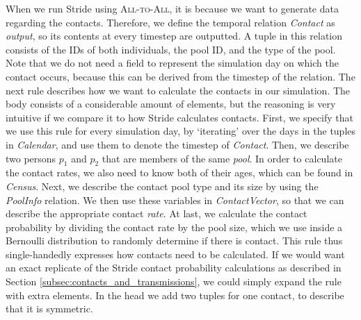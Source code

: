 \noindent When we run Stride using \textsc{All-to-All}, it is because we want to generate data regarding the contacts. Therefore, we define the temporal relation \textit{Contact} as \textit{output}, so its contents at every timestep are outputted. A tuple in this relation consists of the IDs of both individuals, the pool ID, and the type of the pool. Note that we do not need a field to represent the simulation day on which the contact occurs, because this can be derived from the timestep of the relation. The next rule describes how we want to calculate the contacts in our simulation. The body consists of a considerable amount of elements, but the reasoning is very intuitive if we compare it to how Stride calculates contacts. First, we specify that we use this rule for every simulation day, by `iterating' over the days in the tuples in \textit{Calendar}, and use them to denote the timestep of \textit{Contact}. Then, we describe two persons $p_{1}$ and $p_{2}$ that are members of the same \textit{pool}. In order to calculate the contact rates, we also need to know both of their ages, which can be found in \textit{Census}. Next, we describe the contact pool type and its size by using the \textit{PoolInfo} relation. We then use these variables in \textit{ContactVector}, so that we can describe the appropriate contact \textit{rate}. At last, we calculate the contact probability by dividing the contact rate by the pool size, which we use inside a Bernoulli distribution to randomly determine if there is contact. This rule thus single-handedly expresses how contacts need to be calculated. If we would want an exact replicate of the Stride contact probability calculations as described in Section \ref{subsec:contacts_and_transmissions}, we could simply expand the rule with extra elements. In the head we add two tuples for one contact, to describe that it is symmetric.
\\\\
